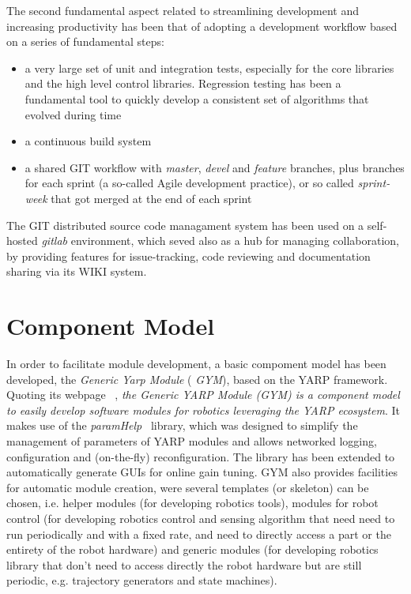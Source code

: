 The second fundamental aspect related to streamlining development and increasing productivity has been that of adopting a development workflow based on a series of fundamental steps:
\begin{itemize}
 \item a very large set of unit and integration tests, especially for the core libraries and the high level control libraries. Regression testing has been a fundamental tool to quickly develop a consistent set of algorithms that evolved during time
 \item a continuous build system
 \item a shared GIT workflow with \emph{master}, \emph{devel} and \emph{feature} branches, plus branches for each sprint (a so-called Agile development practice), or so called \emph{sprint-week} that got merged at the end of each sprint
\end{itemize}
The GIT distributed source code managament system has been used on a self-hosted \emph{gitlab} environment, which seved also as a hub for managing collaboration, by providing features for issue-tracking, code reviewing and documentation sharing via its WIKI system.

\section{Component Model}
In order to facilitate module development, a basic compoment model has been developed, the \emph{Generic Yarp Module} ( \emph{GYM}), based on the YARP framework.
Quoting its webpage ~\cite{GYM}, \emph{the Generic YARP Module (GYM) is a component model to easily develop software modules for robotics leveraging the YARP ecosystem}.
It makes use of the \emph{paramHelp}~\cite{paramHelp} library, which was designed to simplify the management of parameters of YARP modules and allows networked logging, configuration and (on-the-fly) reconfiguration. The library has been extended to automatically generate GUIs for online gain tuning. GYM also provides facilities for automatic module creation, were several templates (or skeleton) can be chosen, i.e. helper modules (for developing robotics tools), modules for robot control (for developing robotics control and sensing algorithm that need need to run periodically and with a fixed rate, and need to directly access a part or the entirety of the robot hardware) and generic modules (for developing robotics library that don't need to access directly the robot hardware but are still periodic, e.g. trajectory generators and state machines). 

